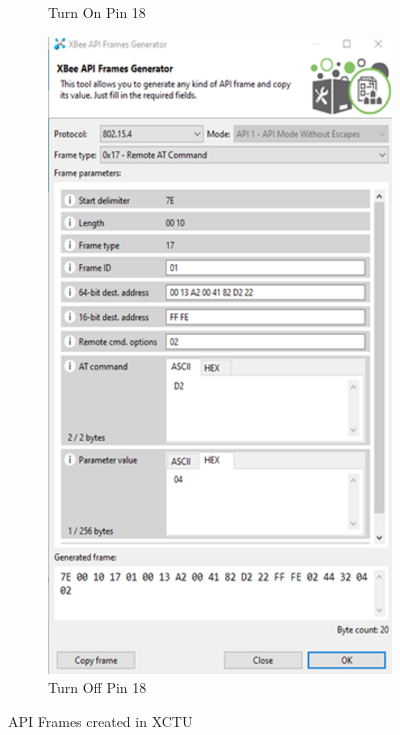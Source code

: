 \documentclass[letter,twocolumn]{report}
\begin{document}
\begin{figure}[h!]
\begin{subfigure}[t]{0.22\textwidth}
			\caption{Turn On Pin 18}
		\end{subfigure}
		\begin{subfigure}[t]{0.22\textwidth}
			\centering
			\includegraphics[width=\textwidth]{xctuFrames2.png}
			\caption{Turn Off Pin 18}
		\end{subfigure}
		\caption{API Frames created in XCTU}
	\end{figure} 
\end{document}
